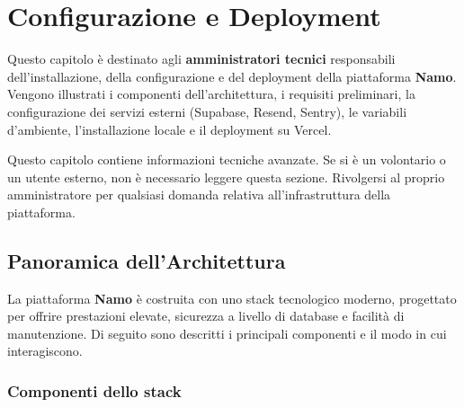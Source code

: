 \documentclass[a4paper,11pt,oneside]{book}
\newcommand{\namo}{\textbf{Namo}}
\begin{document}
\chapter{Configurazione e Deployment}
\label{ch:configurazione-deployment}

Questo capitolo \`e destinato agli \textbf{amministratori tecnici} responsabili dell'installazione, della configurazione e del deployment della piattaforma \namo{}. Vengono illustrati i componenti dell'architettura, i requisiti preliminari, la configurazione dei servizi esterni (Supabase, Resend, Sentry), le variabili d'ambiente, l'installazione locale e il deployment su Vercel.

\begin{warningbox}
Questo capitolo contiene informazioni tecniche avanzate. Se si \`e un volontario o un utente esterno, non \`e necessario leggere questa sezione. Rivolgersi al proprio amministratore per qualsiasi domanda relativa all'infrastruttura della piattaforma.
\end{warningbox}

\section{Panoramica dell'Architettura}
\label{sec:architettura}

La piattaforma \namo{} \`e costruita con uno stack tecnologico moderno, progettato per offrire prestazioni elevate, sicurezza a livello di database e facilit\`a di manutenzione. Di seguito sono descritti i principali componenti e il modo in cui interagiscono.

\subsection{Componenti dello stack}
\end{document}
